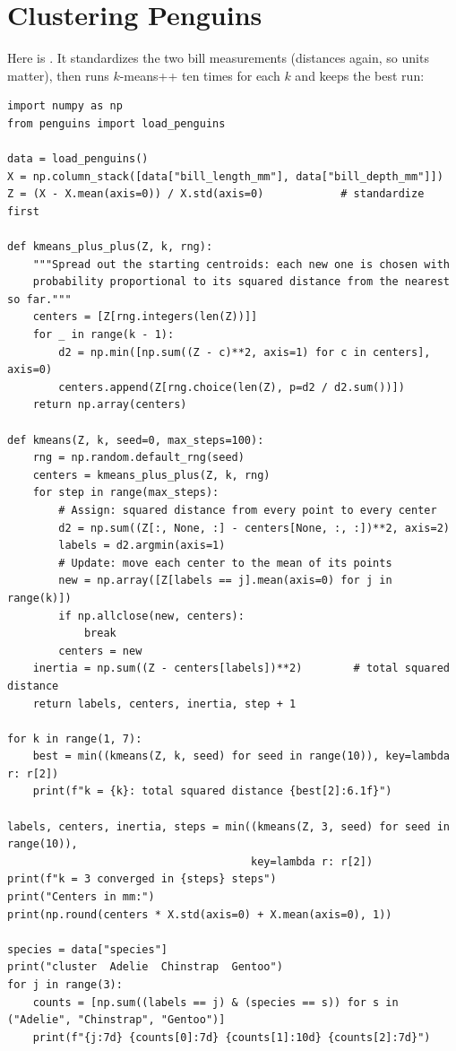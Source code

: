 \section{Clustering Penguins}
Here is . It standardizes the two bill measurements (distances again, so units matter), then
runs $k$-means++ ten times for each $k$ and keeps the best run:

\begin{verbatim}
import numpy as np
from penguins import load_penguins

data = load_penguins()
X = np.column_stack([data["bill_length_mm"], data["bill_depth_mm"]])
Z = (X - X.mean(axis=0)) / X.std(axis=0)            # standardize first

def kmeans_plus_plus(Z, k, rng):
    """Spread out the starting centroids: each new one is chosen with
    probability proportional to its squared distance from the nearest so far."""
    centers = [Z[rng.integers(len(Z))]]
    for _ in range(k - 1):
        d2 = np.min([np.sum((Z - c)**2, axis=1) for c in centers], axis=0)
        centers.append(Z[rng.choice(len(Z), p=d2 / d2.sum())])
    return np.array(centers)

def kmeans(Z, k, seed=0, max_steps=100):
    rng = np.random.default_rng(seed)
    centers = kmeans_plus_plus(Z, k, rng)
    for step in range(max_steps):
        # Assign: squared distance from every point to every center
        d2 = np.sum((Z[:, None, :] - centers[None, :, :])**2, axis=2)
        labels = d2.argmin(axis=1)
        # Update: move each center to the mean of its points
        new = np.array([Z[labels == j].mean(axis=0) for j in range(k)])
        if np.allclose(new, centers):
            break
        centers = new
    inertia = np.sum((Z - centers[labels])**2)        # total squared distance
    return labels, centers, inertia, step + 1

for k in range(1, 7):
    best = min((kmeans(Z, k, seed) for seed in range(10)), key=lambda r: r[2])
    print(f"k = {k}: total squared distance {best[2]:6.1f}")

labels, centers, inertia, steps = min((kmeans(Z, 3, seed) for seed in range(10)),
                                      key=lambda r: r[2])
print(f"k = 3 converged in {steps} steps")
print("Centers in mm:")
print(np.round(centers * X.std(axis=0) + X.mean(axis=0), 1))

species = data["species"]
print("cluster  Adelie  Chinstrap  Gentoo")
for j in range(3):
    counts = [np.sum((labels == j) & (species == s)) for s in ("Adelie", "Chinstrap", "Gentoo")]
    print(f"{j:7d} {counts[0]:7d} {counts[1]:10d} {counts[2]:7d}")
\end{verbatim}

